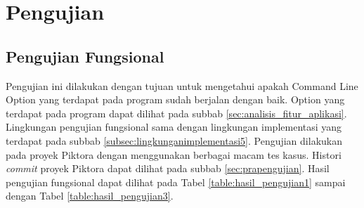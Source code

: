 \section{Pengujian}
\label{sec:pengujian}

\subsection{Pengujian Fungsional}
\label{sec:pengujian_fungsional} 
Pengujian ini dilakukan dengan tujuan untuk mengetahui apakah Command Line Option yang terdapat pada program sudah berjalan dengan baik. Option yang terdapat pada program dapat dilihat pada subbab \ref{sec:analisis_fitur_aplikasi}. Lingkungan pengujian fungsional sama dengan lingkungan implementasi yang terdapat pada subbab \ref{subsec:lingkunganimplementasi5}. Pengujian dilakukan pada proyek Piktora dengan menggunakan berbagai macam tes kasus. Histori \textit{commit} proyek Piktora dapat dilihat pada subbab \ref{sec:prapengujian}. Hasil pengujian fungsional dapat dilihat pada Tabel \ref{table:hasil_pengujian1} sampai dengan Tabel \ref{table:hasil_pengujian3}.


